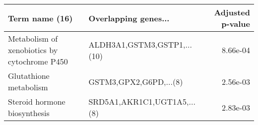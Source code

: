 \begin{tabular}{llr}
\toprule
                              Term name (16) &        Overlapping genes... &  Adjusted p-value \\
\midrule
Metabolism of xenobiotics by cytochrome P450 & ALDH3A1,GSTM3,GSTP1,...(10) &          8.66e-04 \\
                      Glutathione metabolism &      GSTM3,GPX2,G6PD,...(8) &          2.56e-03 \\
                Steroid hormone biosynthesis & SRD5A1,AKR1C1,UGT1A5,...(8) &          2.83e-03 \\
\bottomrule
\end{tabular}
